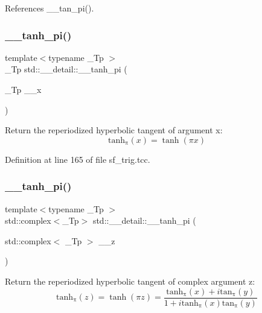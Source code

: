 References \+\_\+\+\_\+tan\+\_\+pi().

\mbox{\label{namespacestd_1_1____detail_ab0c02d3c15b8297df52b74807f22169b}} 
\subsubsection{\texorpdfstring{\+\_\+\+\_\+tanh\+\_\+pi()}{\_\_tanh\_pi()}\hspace{0.1cm}{\footnotesize\ttfamily [1/2]}}
{\footnotesize\ttfamily template$<$typename \+\_\+\+Tp $>$ \\
\+\_\+\+Tp std\+::\+\_\+\+\_\+detail\+::\+\_\+\+\_\+tanh\+\_\+pi (\begin{DoxyParamCaption}\item[{\+\_\+\+Tp}]{\+\_\+\+\_\+x }\end{DoxyParamCaption})}

Return the reperiodized hyperbolic tangent of argument x\+: \[ \mathrm{tanh_\pi}(x) = \tanh(\pi x) \] 

Definition at line 165 of file sf\+\_\+trig.\+tcc.

\mbox{\label{namespacestd_1_1____detail_a75775747d40813d5d54c0b7a7d0c39f0}} 
\subsubsection{\texorpdfstring{\+\_\+\+\_\+tanh\+\_\+pi()}{\_\_tanh\_pi()}\hspace{0.1cm}{\footnotesize\ttfamily [2/2]}}
{\footnotesize\ttfamily template$<$typename \+\_\+\+Tp $>$ \\
std\+::complex$<$\+\_\+\+Tp$>$ std\+::\+\_\+\+\_\+detail\+::\+\_\+\+\_\+tanh\+\_\+pi (\begin{DoxyParamCaption}\item[{std\+::complex$<$ \+\_\+\+Tp $>$}]{\+\_\+\+\_\+z }\end{DoxyParamCaption})}

Return the reperiodized hyperbolic tangent of complex argument z\+: \[ \mathrm{tanh_\pi}(z) = \tanh(\pi z) = \frac{\mathrm{tanh_\pi}(x) + i \mathrm{tan_\pi}(y)} {1 + i \mathrm{tanh_\pi}(x) \mathrm{tan_\pi}(y)} \] 

